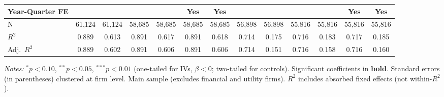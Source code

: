 \documentclass[11pt,a4paper]{article}
\begin{document}
\begin{table}[htbp]
\begin{tabular}{lcccccccccccc}
Year-Quarter FE &  &  &  &  & Yes & Yes &  &  &  &  & Yes & Yes \\
\midrule
N & 61,124 & 61,124 & 58,685 & 58,685 & 58,685 & 58,685 & 56,898 & 56,898 & 55,816 & 55,816 & 55,816 & 55,816 \\
$R^2$ & 0.889 & 0.613 & 0.891 & 0.617 & 0.891 & 0.618 & 0.714 & 0.175 & 0.716 & 0.183 & 0.717 & 0.185 \\
Adj.~$R^2$ & 0.889 & 0.602 & 0.891 & 0.606 & 0.891 & 0.606 & 0.714 & 0.151 & 0.716 & 0.158 & 0.716 & 0.160 \\
\bottomrule
\end{tabular}
\begin{minipage}{\linewidth}
\vspace{2pt}\scriptsize
\textit{Notes:} $^{*}p<0.10$, $^{**}p<0.05$, $^{***}p<0.01$ (one-tailed for IVs, $\beta < 0$; two-tailed for controls).
 Significant coefficients in \textbf{bold}.
 Standard errors (in parentheses) clustered at firm level.
 Main sample (excludes financial and utility firms).
 $R^2$ includes absorbed fixed effects (not within-$R^2$).
\end{minipage}
\end{table}
\clearpage
\end{document}
